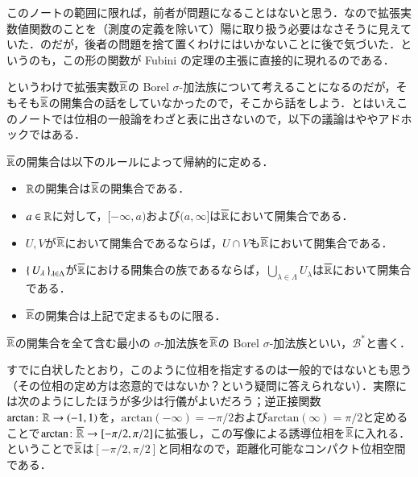 \begin{dig}
このノートの範囲に限れば，前者が問題になることはないと思う．なので拡張実数値関数のことを（測度の定義を除いて）陽に取り扱う必要はなさそうに見えていた．のだが，後者の問題を捨て置くわけにはいかないことに後で気づいた．というのも，この形の関数が Fubini の定理の主張に直接的に現れるのである．
\end{dig}


というわけで拡張実数$\overline{\mathbb{R}}$の Borel $\sigma$-加法族について考えることになるのだが，そもそも$\overline{\mathbb{R}}$の開集合の話をしていなかったので，そこから話をしよう．とはいえこのノートでは位相の一般論をわざと表に出さないので，以下の議論はややアドホックではある．

\begin{defi}
$\overline{\mathbb{R}}$の開集合は以下のルールによって帰納的に定める．
\begin{itemize}
\item $\mathbb{R}$の開集合は$\overline{\mathbb{R}}$の開集合である．
\item $a \in \mathbb{R}$に対して，$[-\infty,a)$および$(a,\infty]$は$\overline{\mathbb{R}}$において開集合である．
\item $U,V$が$\overline{\mathbb{R}}$において開集合であるならば，$U \cap V$も$\overline{\mathbb{R}}$において開集合である．
\item $\set{U_\lambda}_{\lambda \in \Lambda}$が$\overline{\mathbb{R}}$における開集合の族であるならば，$\bigcup_{\lambda \in \Lambda} U_\lambda$は$\overline{\mathbb{R}}$において開集合である．
\item $\overline{\mathbb{R}}$の開集合は上記で定まるものに限る．
\end{itemize}
$\overline{\mathbb{R}}$の開集合を全て含む最小の $\sigma$-加法族を$\overline{\mathbb{R}}$の Borel $\sigma$-加法族といい，$\mathcal{B}^*$と書く．
\end{defi}

\begin{que}[*]すでに白状したとおり，このように位相を指定するのは一般的ではないとも思う（その位相の定め方は恣意的ではないか？という疑問に答えられない）．実際には次のようにしたほうが多少は行儀がよいだろう；逆正接関数$\mathrm{arctan} \colon \mathbb{R} \to (-1,1)$を，$\mathrm{arctan}(-\infty) = -\pi/2$および$\mathrm{arctan}(\infty)=\pi/2$と定めることで$\mathrm{arctan} \colon \overline{\mathbb{R}} \to [-\pi/2,\pi/2]$に拡張し，この写像による誘導位相を$\overline {\mathbb{R}}$に入れる．ということで$\overline {\mathbb{R}}$は$[-\pi/2,\pi/2]$と同相なので，距離化可能なコンパクト位相空間である．
\end{que}


